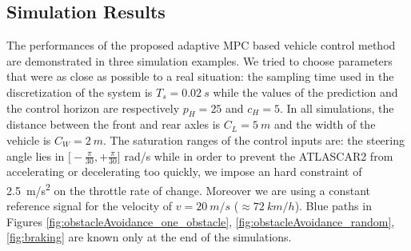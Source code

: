 \documentclass[conference,11pt]{IEEEtran}
\begin{document}
\subsection{Simulation Results}
The performances of the proposed adaptive MPC based vehicle control method are demonstrated in three simulation examples. We tried to choose parameters that were as close as possible to a real situation: the sampling time used in the discretization of the system is $T_s=\SI{0.02}{s}$ while the values of the prediction and the control horizon are respectively $p_H=25$ and $c_H=5$. In all simulations, the distance between the front and rear axles is $C_L=\SI{5}{m}$ and the width of the vehicle is $C_W=\SI{2}{m}$. The saturation ranges of the control inputs are: the steering angle lies in $\big[-\frac{\pi}{30}, +\frac{\pi}{30}\big]$ rad/s while in order to prevent the ATLASCAR2 from accelerating or decelerating too quickly, we impose an hard constraint of \SI{2.5}{m/s^2} on the throttle rate of change. Moreover we are using a constant reference signal for the velocity of $v=\SI{20}{m/s}$ ($\approx\SI{72}{km/h}$).
Blue paths in Figures \ref{fig:obstacleAvoidance_one_obstacle}, \ref{fig:obstacleAvoidance_random}, \ref{fig:braking} are known only at the end of the simulations.
\end{document}
